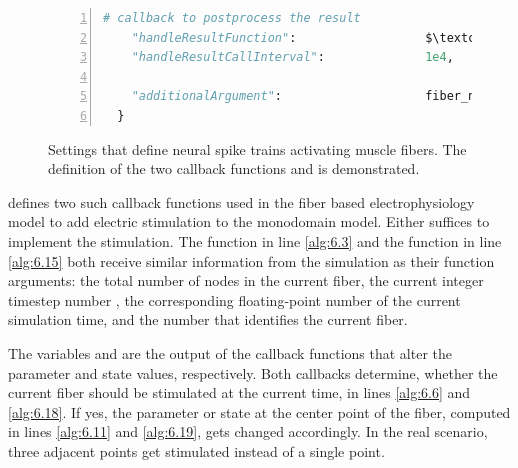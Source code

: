 \begin{figure}
\begin{framed}
\begin{lstlisting}[basicstyle=\footnotesize\ttfamily,commentstyle=\color{gray},numbers=left,language=python]
    # callback to postprocess the result
    "handleResultFunction":                  $\textcolor{Maroon}{\text{\ttfamily handle\_result}}$,    $\label{alg:6.41}$
    "handleResultCallInterval":              1e4,         
     
    "additionalArgument":                    fiber_no,        $\label{alg:6.43}$
  }

\end{lstlisting}
\end{framed}
\caption{Settings that define neural spike trains activating muscle fibers. The definition of the two callback functions  and  is demonstrated.}%
\label{fig:example_callback_functions}%
\end{figure}

 defines two such callback functions used in the fiber based electrophysiology model to add electric stimulation to the monodomain model. Either suffices to implement the stimulation. The function  in line \ref{alg:6.3} and the function  in line \ref{alg:6.15} both receive similar information from the simulation as their function arguments: the total number  of nodes in the current fiber, the current integer timestep number , the corresponding floating-point number  of the current simulation time, and the number  that identifies the current fiber.

The variables  and  are the output of the callback functions that alter the parameter and state values, respectively. Both callbacks determine, whether the current fiber should be stimulated at the current time, in lines \ref{alg:6.6} and \ref{alg:6.18}.
If yes, the parameter or state at the center point of the fiber, computed in lines \ref{alg:6.11} and \ref{alg:6.19}, gets changed accordingly. In the real scenario, three adjacent points get stimulated instead of a single point.

